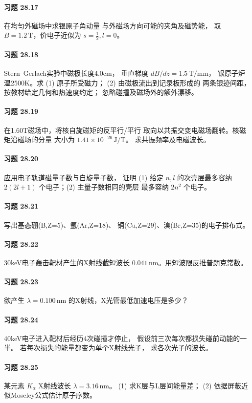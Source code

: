\paragraph{习题 28.17}
在均匀外磁场中求银原子角动量
与外磁场方向可能的夹角及磁势能，
取 \(B=1.2\,\mathrm T\)，价电子近似为
\(s=\frac12,l=0\)。
\paragraph{习题 28.18}
Stern--Gerlach实验中磁极长度4.0cm，
垂直梯度 \(dB/dz=1.5\,\mathrm{T/mm}\)，
银原子炉温2500K。求
(1) 原子所受磁力；
(2) 由磁极流出到记录板形成的
两条银迹间距，按教材给定几何和热速度约定；
忽略碰撞及磁场外的额外漂移。
\paragraph{习题 28.19}
在1.60T磁场中，将核自旋磁矩的反平行/平行
取向以共振交变电磁场翻转。核磁矩沿磁场的分量
大小为 \(1.41\times10^{-26}\,\mathrm{J/T}\)。
求共振频率及电磁波长。
\paragraph{习题 28.20}
应用电子轨道磁量子数与自旋量子数，
证明 (1) 给定 \(n,l\) 的次壳层最多容纳
\(2(2l+1)\) 个电子；(2) 主量子数相同的壳层
最多容纳 \(2n^2\) 个电子。
\paragraph{习题 28.21}
写出基态硼(B,Z=5)、氩(Ar,Z=18)、
铜(Cu,Z=29)、溴(Br,Z=35)的电子排布式。
\paragraph{习题 28.22}
30keV电子轰击靶材产生的X射线截短波长
\(0.041\,\mathrm{nm}\)。用短波限反推普朗克常数。
\paragraph{习题 28.23}
欲产生 \(\lambda=0.100\,\mathrm{nm}\)
的X射线，X光管最低加速电压是多少？
\paragraph{习题 28.24}
40keV电子进入靶材后经历4次碰撞才停止，
假设前三次每次都损失碰前动能的一半。
若每次损失的能量都变为单个X射线光子，
求各次光子的波长。
\paragraph{习题 28.25}
某元素 \(K_\alpha\) X射线波长
\(\lambda=3.16\,\mathrm{nm}\)。
(1) 求K层与L层间能量差；
(2) 依据屏蔽近似Moseley公式估计原子序数。
